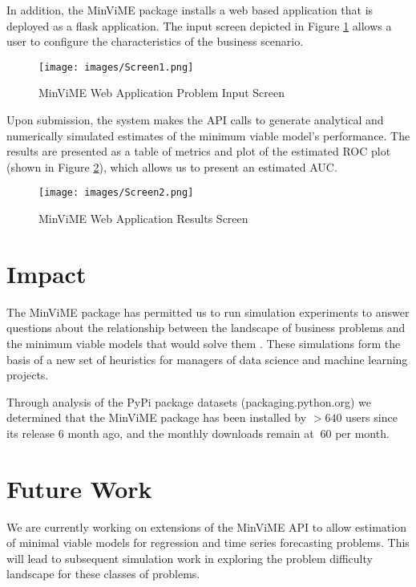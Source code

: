 \documentclass[preprint,12pt, a4paper]{elsarticle}
\begin{document}
In addition, the MinViME package installs a web based application
that is deployed as a flask application. The input screen depicted
in Figure \ref{screen1} allows a user to configure the characteristics of the business
scenario. 

\begin{figure}[h!]
\texttt{[image: images/Screen1.png]}
\caption{MinViME Web Application Problem Input Screen}
\label{screen1}
\end{figure}

Upon submission, the system makes the API calls to generate analytical and
numerically simulated estimates of the minimum viable model's performance. The results
are presented as a table of metrics and plot of the estimated ROC plot (shown in Figure \ref{screen2}), which allows us to present an estimated AUC\cite{Bradley97}.
 
\begin{figure}[h!]
\texttt{[image: images/Screen2.png]}
\caption{MinViME Web Application Results Screen}
\label{screen2}
\end{figure}

\section{Impact}

The MinViME package has permitted us to run simulation experiments to answer questions
about the relationship between the landscape of business problems and the minimum 
viable models that would solve them \cite{Hawkins2020}.
These simulations form the basis of a new set of heuristics for managers of data science
and machine learning projects.

Through analysis of the PyPi package datasets (packaging.python.org)
we determined that the MinViME package has been installed 
by $>640$ users since its release 6 month ago, and the monthly downloads 
remain at $~60$ per month.


\section{Future Work}

We are currently working on extensions of the MinViME API to allow estimation of 
minimal viable models for regression and time series forecasting problems. 
This will lead to subsequent simulation work in exploring the problem difficulty landscape
for these classes of problems. 
\end{document}
